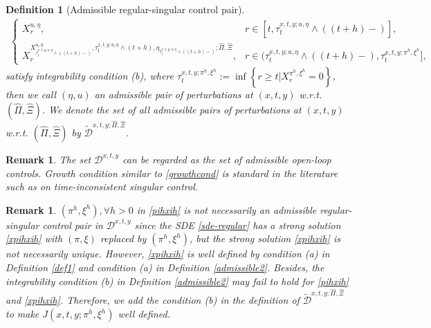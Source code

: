 \documentclass[11pt,reqno]{article}%
\newtheorem{definition}[theorem]{Definition}
\newtheorem{remark}[theorem]{Remark}
\numberwithin{equation}{section}
\begin{document}
\begin{definition}[Admissible regular-singular control pair]
\begin{equation}
\begin{aligned}
\begin{cases}
X^{u,\eta}_{r}, & r\in[t,\tau^{x,t,y;u,\eta}_{t}\wedge((t+h)-)],\\
X^{X^{u,\eta}_{\tau^{x,t,y;u,\eta}_{t}\wedge((t+h)-)},\tau^{x,t,y;u,\eta}_{t}\wedge(t+h),\eta_{\tau^{x,t,y;u,\eta}_{t}\wedge((t+h)-)};\hat{\Pi},\hat{\Xi}}_{r}, &  r\in(\tau^{x,t,y;u,\eta}_{t}\wedge((t+h)-),\tau^{x,t,y;\pi^h,\xi^h}_{t}],
\end{cases}
\end{aligned}\label{xpihxih}
\end{equation}
satisfy integrability condition (b), where $\tau^{x,t,y;\pi^h,\xi^h}_{t}:=\inf\left\{r\ge t|X^{\pi^h,\xi^h}_{r}= 0\right\}$, then we call $\left(\eta,u\right)$ an admissible pair of perturbations at $(x,t,y)$  w.r.t. $\left(\hat\Pi, \hat\Xi\right)$. We denote the set of all admissible pairs of perturbations at $(x,t,y)$  w.r.t. $\left(\hat\Pi, \hat\Xi\right)$ by $\mathcal{\tilde D}^{x,t,y;\hat\Pi,\hat\Xi}$.
\end{definition}

\begin{remark}
The set $\mathcal{D}^{x,t,y}$ can be regarded as the set of admissible open-loop controls. Growth condition similar to \eqref{growthcond} is standard in the literature such as \citet{liang2025stackelberg} on time-inconsistent singular control.
\end{remark}

\begin{remark}\label{wellposed}
$\left(\pi^{h},\xi^{h}\right), \forall h>0$ in \eqref{pihxih} is not necessarily an admissible regular-singular control pair in $\mathcal{D}^{x,t,y}$ since the SDE \eqref{sde-regular} has a strong solution \eqref{xpihxih} with $(\pi,\xi)$ replaced by $\left(\pi^{h},\xi^{h}\right)$, but the strong solution \eqref{xpihxih} is not necessarily unique. However, \eqref{xpihxih} is well defined by condition (a) in Definition \ref{def1} and condition (a) in Definition \ref{admissible2}. Besides, the integrability condition (b) in Definition \ref{admissible2} may fail to hold for \eqref{pihxih} and \eqref{xpihxih}. Therefore, we add the condition (b) in the definition of $\mathcal{\tilde D}^{x,t,y;\hat\Pi,\hat\Xi}$ to make $J\left(x,t,y;\pi^{h},\xi^{h}\right)$ well defined.
\end{remark}
\end{document}
